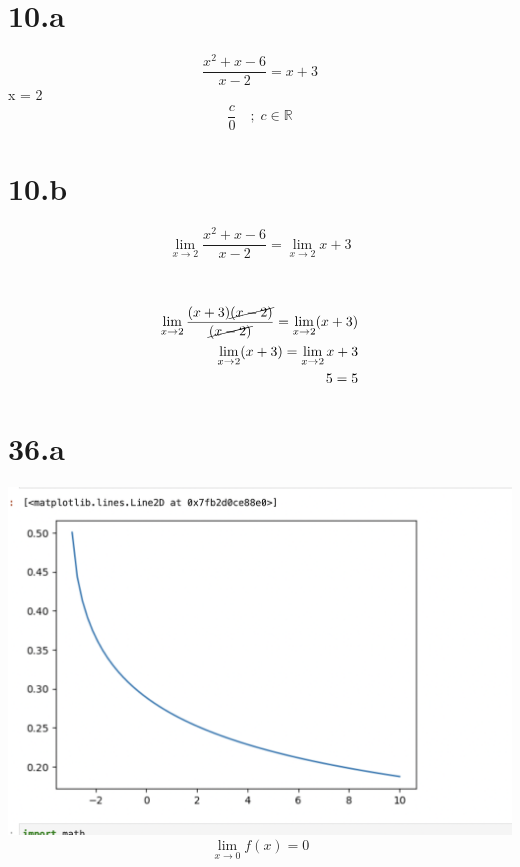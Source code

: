 \documentclass{article}
\begin{document}
\section{10.a}
\[
    \frac{x^2 + x - 6}{x - 2} = x + 3
\]
 x = 2 \\
\[
    \frac{c}{0} \quad ; \; c \in \mathbb{R}
\]


\section{10.b}
\[
    \lim_{x \to 2} \frac{x^2 + x - 6}{x - 2}
    =
    \lim_{x \to 2} x + 3
\]
\\
 \\

\begin{align}

    \lim_{x \to 2} \dfrac { (x + 3) \cancel{(x - 2)} } { \cancel{(x - 2)} }
    =
    \lim_{x \to 2} (x + 3) \\

    \lim_{x \to 2} (x+3) = \lim_{x \to 2} x + 3 \\

    5 = 5 \\

\end{align}

\section{36.a}
\includegraphics[scale=0.3]{graph.png}
\[
    \lim_{x \to 0} f(x) = 0
\]
\end{document}
